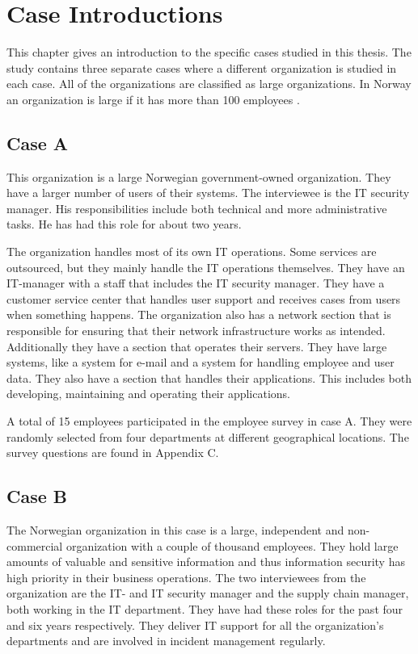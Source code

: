 \chapter{Case Introductions}
\label{chp:CaseIntroductions}
This chapter gives an introduction to the specific cases studied in this thesis. The study contains three separate cases where a different organization is studied in each case. All of the organizations are classified as large organizations. In Norway an organization is large if it has more than 100 employees \cite{SMB}.

\section{Case A}
This organization is a large Norwegian government-owned organization. They have a larger number of users of their systems. The interviewee is the IT security manager. His responsibilities include both technical and more administrative tasks. He has had this role for about two years.

The organization handles most of its own IT operations. Some services are outsourced, but they mainly handle the IT operations themselves. They have an IT-manager with a staff that includes the IT security manager. They have a customer service center %
that handles user support and receives cases from users when something happens. The organization also has a network section that is responsible for ensuring that their network infrastructure works as intended. Additionally they have a section that operates their servers. They have large systems, like a system for e-mail and a system for handling employee and user data. They also have a section that handles their applications. This includes both developing, maintaining and operating their applications.

A total of 15 employees participated in the employee survey in case A. They were randomly selected from four departments at different geographical locations. The survey questions are found in Appendix C.

\section{Case B}
The Norwegian organization in this case is a large, independent and non-commercial organization with a couple of thousand employees. They hold large amounts of valuable and sensitive information and thus information security has high priority in their business operations. The two interviewees from the organization are the IT- and IT security manager and the supply chain manager, both working in the IT department. They have had these roles for the past four and six years respectively. They deliver IT support for all the organization's departments and are involved in incident management regularly.   

